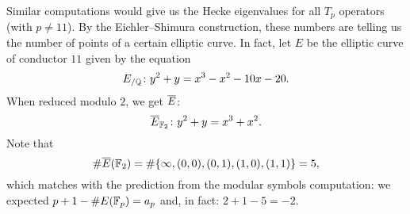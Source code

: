 Similar computations would give us the Hecke eigenvalues for all $T_p$ operators (with $p\neq 11$). By the Eichler--Shimura construction, these numbers are telling us the number of points of a certain elliptic curve. In fact, let $E$ be the elliptic curve of conductor $11$ given by the equation
\[
E_{/\mathbb{Q}} \colon y^2+y=x^3-x^2-10x-20.
\]
When reduced modulo $2$, we get $\overline{E}$:
\[
\overline{E}_{\mathbb{F}_2} \colon y^2+y=x^3+x^2.
\]
Note that
\[
\#\overline{E}(\mathbb{F}_2)=\#\{\infty, (0,0),(0,1),(1,0),(1,1)\} =5,
\]
which matches with the prediction from the modular symbols computation: we expected $p+1-\#E(\mathbb{F}_p) = a_p$ and, in fact: $2+1-5 = -2$.



